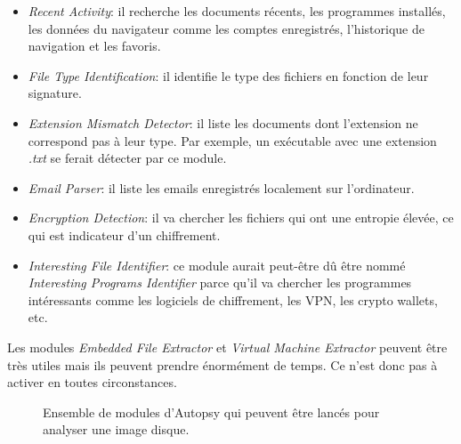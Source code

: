 \begin{itemize}
    \item \textit{Recent Activity}: il recherche les documents récents, les programmes installés, les données du navigateur comme les comptes enregistrés, l'historique de navigation et les favoris.
    \item \textit{File Type Identification}: il identifie le type des fichiers en fonction de leur signature.
    \item \textit{Extension Mismatch Detector}: il liste les documents dont l'extension ne correspond pas à leur type. Par exemple, un exécutable avec une extension \textit{.txt} se ferait détecter par ce module.
    \item \textit{Email Parser}: il liste les emails enregistrés localement sur l'ordinateur.
    \item \textit{Encryption Detection}: il va chercher les fichiers qui ont une entropie élevée, ce qui est indicateur d'un chiffrement.
    \item \textit{Interesting File Identifier}: ce module aurait peut-être dû être nommé \textit{Interesting Programs Identifier} parce qu'il va chercher les programmes intéressants comme les logiciels de chiffrement, les VPN, les crypto wallets, etc.
\end{itemize}

Les modules \textit{Embedded File Extractor} et \textit{Virtual Machine Extractor} peuvent être très utiles mais ils peuvent prendre énormément de temps. Ce n'est donc pas à activer en toutes circonstances.

\begin{figure}
    \centering
    \caption{Ensemble de modules d'Autopsy qui peuvent être lancés pour analyser une image disque.}
    \label{fig:autopsy-ingest}
\end{figure}



